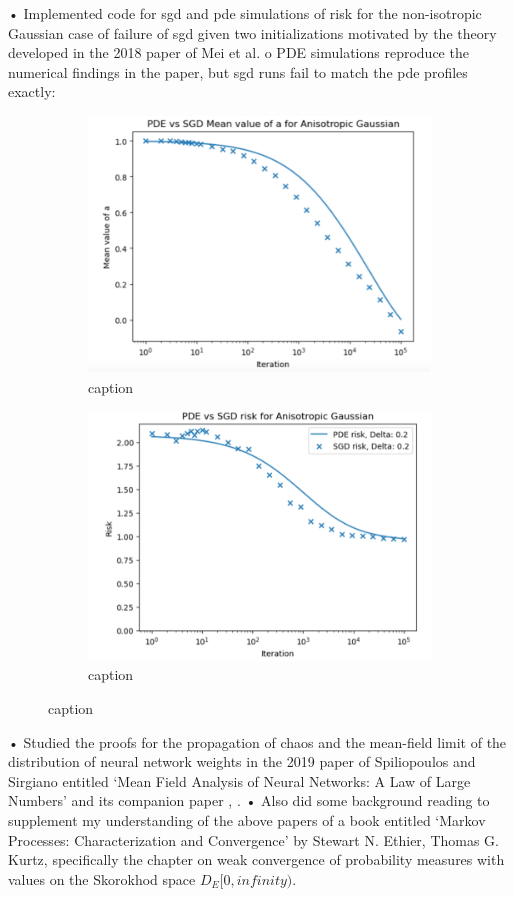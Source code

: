 \documentclass{article}
\begin{document}
•	Implemented code for sgd and pde simulations of risk for the non-isotropic Gaussian case of failure of sgd given two initializations motivated by the theory developed in the 2018 paper of Mei et al.
o	PDE simulations reproduce the numerical findings in the paper, but sgd runs fail to match the pde profiles exactly:
     \begin{figure}[H]
 \begin{subfigure}{0.5\textwidth}
   \centering
   \includegraphics[width=0.8\linewidth]{images/NGuyen2018-pde-sgd-gauss-anisotropic.png}
   \caption{ caption}
   \label{fig: description}
 \end{subfigure}%
 \begin{subfigure}{0.5\textwidth}
   \centering
   \includegraphics[width=0.8\linewidth]{images/NGuyen2018-pde-sgd-risk-gauss-anisotropic.png}
   \caption{ caption}
   \label{fig:  description}
 \end{subfigure}
 \caption{ caption}
 \label{fig:  label}
 \end{figure} 
 
•	Studied the proofs for the propagation of chaos and the mean-field limit of the distribution of neural network weights in the 2019 paper of Spiliopoulos and Sirgiano  entitled ‘Mean Field Analysis of Neural Networks: A Law of Large Numbers’ and its companion paper \cite{sirignano2019meanfieldanalysislln}, \cite{sirignano2019meanfieldanalysisclt}.
•	Also did some background reading to supplement my understanding of the above papers of a book entitled ‘Markov Processes: Characterization and Convergence’ by Stewart N. Ethier, Thomas G. Kurtz, specifically the chapter on weak convergence of probability measures with values on the Skorokhod space $D_E[0,infinity)$.
\end{document}
